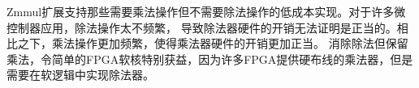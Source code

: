 \begin{commentary}

  Zmmul扩展支持那些需要乘法操作但不需要除法操作的低成本实现。对于许多微控制器应用，除法操作太不频繁，
  导致除法器硬件的开销无法证明是正当的。相比之下，乘法操作更加频繁，使得乘法器硬件的开销更加正当。
  消除除法但保留乘法，令简单的FPGA软核特别获益，因为许多FPGA提供硬布线的乘法器，但是需要在软逻辑中实现除法器。
\end{commentary}
